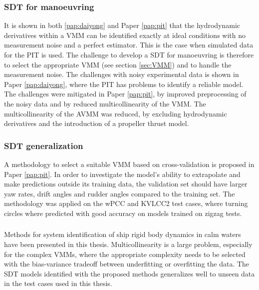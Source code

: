 \subsubsection*{SDT for manoeuvring}
It is shown in both \ref{pap:daiyong} and Paper \ref{pap:pit} that the hydrodynamic derivatives within a VMM can be identified exactly at ideal conditions with no measurement noise and a perfect estimator. This is the case when simulated data for the PIT is used.
The challenge to develop a SDT for manoeuvring is therefore to select the appropriate VMM (see section \ref{sec:VMM}) and to handle the measurement noise.
The challenges with noisy experimental data is shown in Paper \ref{pap:daiyong}, where the PIT has problems to identify a reliable model. The challenges were mitigated in Paper \ref{pap:pit}, by improved preprocessing of the noisy data and by reduced multicollinearity of the VMM. The multicollinearity of the AVMM was reduced, by excluding hydrodynamic derivatives and the introduction of a propeller thrust model.

\subsubsection*{SDT generalization}
A methodology to select a suitable VMM based on cross-validation is proposed in Paper \ref{pap:pit}. In order to investigate the model's ability to extrapolate and make predictions outside its training data, the validation set should have larger yaw rates, drift angles and rudder angles compared to the training set. The methodology was applied on the wPCC and KVLCC2 test cases, where turning circles where predicted with good accuracy on models trained on zigzag tests. 

\subsubsection*{}
Methods for system identification of ship rigid body dynamics in calm waters have been presented in this thesis. Multicollinearity is a large problem, especially for the complex VMMs, where the appropriate complexity needs to be selected with the bias-variance tradeoff between underfitting or overfitting the data. The SDT models identified with the proposed methods generalizes well to unseen data in the test cases used in this thesis.